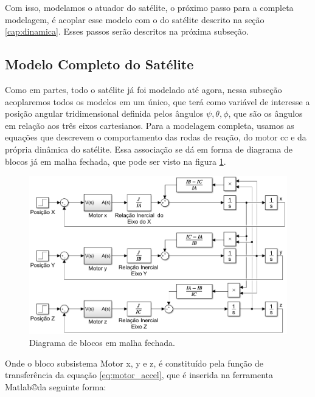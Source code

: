 Com isso, modelamos o atuador do satélite, o próximo passo para a completa modelagem, é acoplar esse modelo com o do satélite descrito na seção \ref{cap:dinamica}. Esses passos serão descritos na próxima subseção.



\subsection{Modelo Completo do Satélite}

Como em partes, todo o satélite já foi modelado até agora, nessa subseção acoplaremos todos os modelos em um único, que terá como variável de interesse a posição angular tridimensional definida pelos ângulos $\psi, \theta, \phi$, que são os ângulos em relação aos três eixos cartesianos. Para a modelagem completa, usamos as equações que descrevem o comportamento das rodas de reação, do motor cc e da própria dinâmica do satélite. Essa associação se dá em forma de diagrama de blocos já em malha fechada, que pode ser visto na figura \ref{fig:simulink_modelo_completo_aberto}.

\begin{figure}[H]
  \caption{Diagrama de blocos em malha fechada.}
  \begin{center}
      \includegraphics[scale=.6]{metodologia/img/simulink_modelo_completo_aberto}
  \end{center}
  \label{fig:simulink_modelo_completo_aberto}
\end{figure}

Onde o bloco subsistema Motor x, y e z, é constituído pela função de transferência da equação \ref{eq:motor_accel}, que é inserida na ferramenta Matlab\copyright da seguinte forma:

